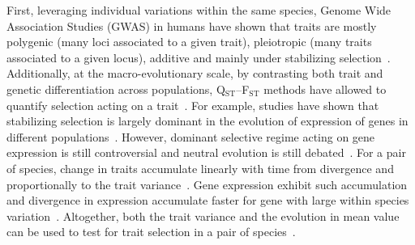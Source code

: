 \documentclass{article}
\begin{document}
First, leveraging individual variations within the same species, Genome Wide Association Studies (GWAS) in humans have shown that traits are mostly polygenic (many loci associated to a given trait), pleiotropic (many traits associated to a given locus), additive and mainly under stabilizing selection~\cite{simons_population_2018, sella_thinking_2019}.
Additionally, at the macro-evolutionary scale, by contrasting both trait and genetic differentiation across populations, Q$_\text{ST}$--F$_\text{ST}$ methods have allowed to quantify selection acting on a trait~\cite{martin_multivariate_2008, leinonen_qst_2013}.
For example, studies have shown that stabilizing selection is largely dominant in the evolution of expression of genes in different populations~\cite{whitehead_neutral_2006, gilad_natural_2006}.
However, dominant selective regime acting on gene expression is still controversial and neutral evolution is still debated~\cite{signor_evolution_2018, price_detecting_2022}.
For a pair of species, change in traits accumulate linearly with time from divergence and proportionally to the trait variance~\cite{lande_genetic_1980, turelli_heritable_1984}.
Gene expression exhibit such accumulation and divergence in expression accumulate faster for gene with large within species variation~\cite{khaitovich_neutral_2004}.
Altogether, both the trait variance and the evolution in mean value can be used to test for trait selection in a pair of species~\cite{walsh_evolution_2018}.
\end{document}
